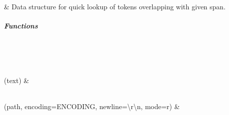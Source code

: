 \documentclass[letterpaper,10pt,english]{sphinxmanual}
\begin{document}
\begin{savenotes}\sphinxatlongtablestart\begin{longtable}[c]{}
\hline

\endfirsthead

%
{}\\
\hline

\endhead

\hline
{}\\
\endfoot

\endlastfoot

\sphinxAtStartPar
{\hyperref[\detokenize{autoapi/pine/backend/pineiaa/bratiaa/utils/index:pine.backend.pineiaa.bratiaa.utils.TokenOverlap}]{}}
&
\sphinxAtStartPar
Data structure for quick lookup of tokens overlapping with given span.
\\
\hline
\end{longtable}\sphinxatlongtableend\end{savenotes}


\subparagraph{Functions}
\label{\detokenize{autoapi/pine/backend/pineiaa/bratiaa/utils/index:functions}}

\begin{savenotes}\sphinxatlongtablestart\begin{longtable}[c]{}
\hline

\endfirsthead

%
{}\\
\hline

\endhead

\hline
{}\\
\endfoot

\endlastfoot

\sphinxAtStartPar
{\hyperref[\detokenize{autoapi/pine/backend/pineiaa/bratiaa/utils/index:pine.backend.pineiaa.bratiaa.utils.tokenize}]{}}(text)
&
\sphinxAtStartPar

\\
\hline
\sphinxAtStartPar
{\hyperref[\detokenize{autoapi/pine/backend/pineiaa/bratiaa/utils/index:pine.backend.pineiaa.bratiaa.utils.read}]{}}(path, encoding=ENCODING, newline=\textquotesingle{}\textbackslash{}r\textbackslash{}n\textquotesingle{}, mode=\textquotesingle{}r\textquotesingle{})
&
\sphinxAtStartPar

\\
\hline
\end{longtable}\sphinxatlongtableend\end{savenotes}
\end{document}
